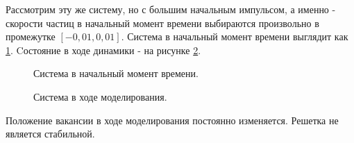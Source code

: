 \documentclass[14pt,a4paper,report]{ncc}
\begin{document}
\newpage
Рассмотрим эту же систему, но с большим начальным импульсом, а именно - скорости частиц в начальный момент времени выбираются произвольно в промежутке $[-0,01, 0,01]$. Система в начальный момент времени выглядит как \ref{ris:image16.1}.
Cостояние в ходе динамики - на рисунке \ref{ris:image16}. 
\begin{figure}[h!]
\caption{Система в начальный момент времени.}
\label{ris:image16.1}
\end{figure}
\begin{figure}[h!]
\caption{Система в ходе моделирования.}
\label{ris:image16}
\end{figure}
Положение вакансии в ходе моделирования постоянно изменяется. Решетка не является стабильной.
\end{document}
